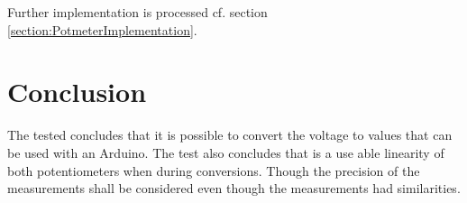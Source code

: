 Further implementation is processed cf. section \ref{section:PotmeterImplementation}.

\section*{Conclusion}
The tested concludes that it is possible to convert the voltage to values that can be used with an Arduino. The test also concludes that is a use able linearity of both potentiometers when during conversions. Though the precision of the measurements shall be considered even though the measurements had similarities. 

